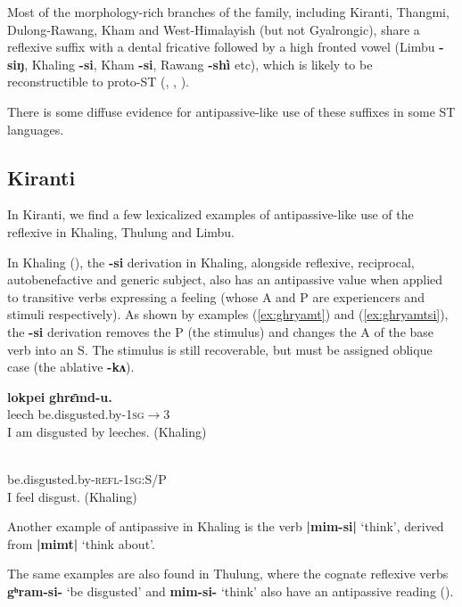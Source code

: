 \documentclass[oneside,a4paper,11pt]{article}
\newcommand{\ipa}[1]{{\phon\textbf{#1}}}
\begin{document}
Most of the morphology-rich branches of the family, including Kiranti, Thangmi, Dulong-Rawang, Kham and West-Himalayish (but not Gyalrongic), share a reflexive suffix with a dental fricative followed by a high fronted vowel (Limbu \ipa{-siŋ}, Khaling \ipa{-si}, Kham \ipa{-si}, Rawang \ipa{-shì} etc), which is likely to be reconstructible to proto-ST (\citealt[94]{bauman75}, \citealt[320]{driem93agreement}, \citealt{jacques16ssuffixes}).

There is some diffuse evidence for antipassive-like use of these suffixes in some ST languages.

\subsection{Kiranti} \label{sec:kiranti.si}
In Kiranti, we find a few lexicalized examples of antipassive-like use of the reflexive in Khaling, Thulung and Limbu.

In Khaling (\citealt{jacques16si}), the \ipa{-si} derivation in Khaling, alongside reflexive, reciprocal, autobenefactive and generic subject, also has an antipassive value when applied to transitive verbs expressing a feeling (whose A and P are experiencers and stimuli respectively). As shown by examples (\ref{ex:ghryamt})  and (\ref{ex:ghryamtsi}), the \ipa{-si} derivation removes the P (the stimulus) and changes the A of the base verb into an S. The stimulus is still recoverable, but must be assigned oblique case (the ablative \ipa{-kʌ}).  

\begin{exe}
\ex \label{ex:ghryamt} 
\gll 
  	\ipa{lokpei}  	\ipa{ghrɛ̄md-u.}  \\
leech  be.disgusted.by-\textsc{1sg$\rightarrow$3} \\
 \glt  I am disgusted by leeches. (Khaling)
\end{exe}

\begin{exe}
\ex \label{ex:ghryamtsi} 
\gll \ipa{gʰrɛ̄m-si-ŋʌ}\\
 be.disgusted.by-\textsc{refl-1sg:S/P} \\
\glt  I feel disgust. (Khaling)
\end{exe}

Another example of antipassive in Khaling is the verb \ipa{|mim-si|} `think', derived from \ipa{|mimt|} `think about'.

The same examples are also found in Thulung, where the cognate reflexive verbs \ipa{gʰram-si-} `be disgusted' and \ipa{mim-si-} `think' also have an antipassive reading (\citealt[56]{lahaussois16reflexive}).
\end{document}
